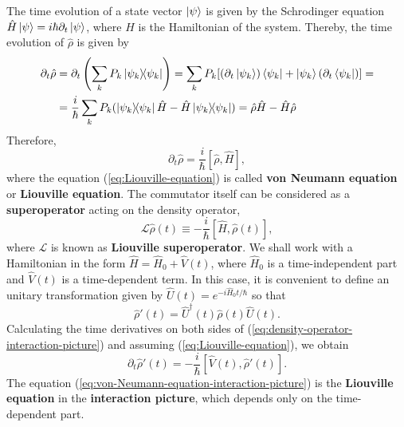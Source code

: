 The time evolution of a state vector $ \ket{\psi} $ is given by the Schrodinger equation $ \hat{H} \ket{\psi} = i \hbar \partial_t \ket{\psi} $, where $ \hat{H} $ is the Hamiltonian of the system. Thereby, the time evolution of $ \hat{\rho} $ is given by
\begin{align}
	\partial_t \hat{\rho} &= \partial_t \left( \sum_{k} P_k \ketbra{\psi_k}{\psi_k} \right) = \sum_{k} P_k [(\partial_t \ket{\psi_k})\bra{\psi_k} + \ket{\psi_k}(\partial_t \bra{\psi_k})] = \\
	&= \frac{i}{\hbar} \sum_{k} P_k (\ketbra{\psi_k}{\psi_k} \hat{H} - \hat{H}\ketbra{\psi_k}{\psi_k}) = \hat{\rho}\hat{H} - \hat{H}\hat{\rho}
\end{align}
Therefore,
\begin{equation}
	\partial_t \hat{\rho} = \frac{i}{\hbar} [\hat{\rho}, \hat{H}],
	\label{eq:Liouville-equation}
\end{equation}
where the equation (\ref{eq:Liouville-equation}) is called \textbf{von Neumann equation} or \textbf{Liouville equation}. The commutator itself can be considered as a \textbf{superoperator} acting on the density operator,
\begin{equation}
	\mathcal{L}\hat{\rho}(t) \equiv - \frac{i}{\hbar} [\hat{H}, \hat{\rho}(t)],
	\label{eq:Liouville-superoperator}
\end{equation}
where $ \mathcal{L} $ is known as \textbf{Liouville superoperator}. We shall work with a Hamiltonian in the form $ \hat{H} = \hat{H}_0 + \hat{V}(t) $, where $ \hat{H}_0 $ is a time-independent part and $ \hat{V}(t) $ is a time-dependent term. In this case, it is convenient to define an unitary transformation given by $ \hat{U}(t) = e^{- i \hat{H}_0 t / \hbar} $ so that 
\begin{equation}
	\hat{\rho}'(t) = \hat{U}^{\dagger}(t)\hat{\rho}(t)\hat{U}(t).
	\label{eq:density-operator-interaction-picture}
\end{equation}
Calculating the time derivatives on both sides of (\ref{eq:density-operator-interaction-picture}) and assuming (\ref{eq:Liouville-equation}), we obtain
\begin{equation}
	\partial_t \hat{\rho}'(t) = - \frac{i}{\hbar} [\hat{V}(t), \hat{\rho}'(t)].
	\label{eq:von-Neumann-equation-interaction-picture}
\end{equation}
The equation (\ref{eq:von-Neumann-equation-interaction-picture}) is the \textbf{Liouville equation} in the \textbf{interaction picture}, which depends only on the time-dependent part.

